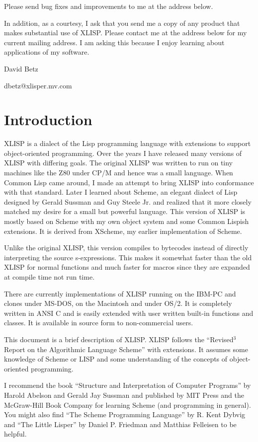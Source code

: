 \documentclass[11pt]{article}
\begin{document}
Please send bug fixes and improvements to me at the address below.

In addition, as a courtesy, I ask that you send me a copy of any
product that makes substantial use of XLISP.  Please contact me at the
address below for my current mailing address.  I am asking this
because I enjoy learning about applications of my software.

David Betz

dbetz@xlisper.mv.com
\section{Introduction}
\label{sec-2}

XLISP is a dialect of the Lisp programming language with extensions to
support object-oriented programming.  Over the years I have released
many versions of XLISP with differing goals.  The original XLISP was
written to run on tiny machines like the Z80 under CP/M and hence was
a small language.  When Common Lisp came around, I made an attempt to
bring XLISP into conformance with that standard.  Later I learned
about Scheme, an elegant dialect of Lisp designed by Gerald Sussman
and Guy Steele Jr. and realized that it more closely matched my desire
for a small but powerful language.  This version of XLISP is mostly
based on Scheme with my own object system and some Common Lispish
extensions.  It is derived from XScheme, my earlier implementation of
Scheme.

Unlike the original XLISP, this version compiles to bytecodes instead
of directly interpreting the source s-expressions.  This makes it
somewhat faster than the old XLISP for normal functions and much
faster for macros since they are expanded at compile time not run
time.

There are currently implementations of XLISP running on the IBM-PC and
clones under MS-DOS, on the Macintosh and under OS/2.  It is
completely written in ANSI C and is easily extended with user written
built-in functions and classes.  It is available in source form to
non-commercial users.

This document is a brief description of XLISP.  XLISP follows the
``Revised$^{\text{3}}$ Report on the Algorithmic Language Scheme'' with
extensions.  It assumes some knowledge of Scheme or LISP and some
understanding of the concepts of object-oriented programming.

I recommend the book ``Structure and Interpretation of Computer
Programs'' by Harold Abelson and Gerald Jay Sussman and published by
MIT Press and the McGraw-Hill Book Company for learning Scheme (and
programming in general).  You might also find ``The Scheme Programming
Language'' by R. Kent Dybvig and ``The Little Lisper'' by Daniel
P. Friedman and Matthias Felleisen to be helpful.
\end{document}
